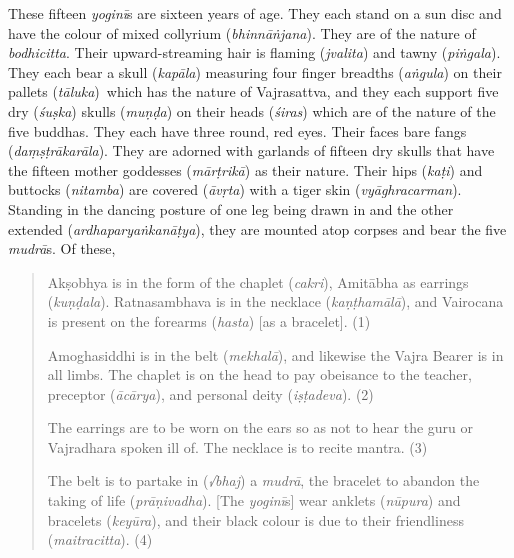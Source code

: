 \documentclass[naipra.tex]{subfiles}
\begin{document}
These fifteen \emph{yoginī}s are sixteen years of age.
They each stand on a sun disc and have the colour of mixed collyrium (\emph{bhinnāṅjana}).
They are of the nature of \emph{bodhicitta}.
Their upward-streaming hair is flaming (\emph{jvalita}) and tawny (\emph{piṅgala}).
They each bear a skull (\emph{kapāla}) measuring four finger breadths (\emph{aṅgula}) \crux on their pallets (\emph{tāluka})\crux\ which has the nature of Vajrasattva, and they each support five dry (\emph{śuṣka}) skulls (\emph{muṇḍa}) on their heads (\emph{śiras}) which are of the nature of the five buddhas.
They each have three round, red eyes.
Their faces bare fangs (\emph{daṃṣṭrākarāla}).
They are adorned with garlands of fifteen dry skulls that have the fifteen mother goddesses (\emph{mārṭrikā}) as their nature.
Their hips (\emph{kaṭi}) and buttocks (\emph{nitamba}) are covered (\emph{āvṛta}) with a tiger skin (\emph{vyāghracarman}).
Standing in the dancing posture of one leg being drawn in and the other extended (\emph{ardhaparyaṅkanāṭya}), they are mounted atop corpses and bear the five \emph{mudrā}s. 
Of these,

\begin{quote}
	Akṣobhya is in the form of the chaplet (\emph{cakri}), Amitābha as earrings (\emph{kuṇḍala}).
	Ratnasambhava is in the necklace (\emph{kaṇṭhamālā}), and Vairocana is present on the forearms (\emph{hasta}) [as a bracelet]. (1)
	
	Amoghasiddhi is in the belt (\emph{mekhalā}), and likewise the Vajra Bearer is in all limbs.
	The chaplet is on the head to pay obeisance to the teacher, preceptor (\emph{ācārya}), and personal deity (\emph{iṣṭadeva}). (2)

	The earrings are to be worn on the ears so as not to hear the guru or Vajradhara spoken ill of.
	The necklace is to recite mantra. (3)

	The belt is to partake in (\emph{√bhaj}) a \emph{mudrā}, the bracelet to abandon the taking of life (\emph{prāṇivadha}). 
	[The \emph{yoginī}s] wear anklets (\emph{nūpura}) and bracelets (\emph{keyūra}), and their black colour is due to their friendliness (\emph{maitracitta}). (4)
\end{quote}
\end{document}
